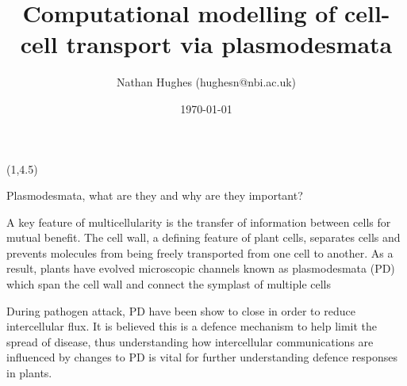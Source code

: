 \documentclass[final]{beamer}
\title{ Computational modelling of cell-cell transport via plasmodesmata }
\author{Nathan Hughes (hughesn@nbi.ac.uk)}
\date{\today}
\begin{document}
\begin{frame}{}

  \begin{textblock}{28}(1,4.5)

    \begin{block}{Plasmodesmata, what are they and why are they important?}

A key feature of multicellularity is the transfer of information
between cells for mutual benefit. The cell wall, a defining feature of
plant cells, separates cells and prevents molecules from being
freely transported from one cell to another. As a result, plants have evolved
microscopic channels known as plasmodesmata (PD) which span the cell
wall and connect the symplast of multiple cells \cite{chevalPlasmodesmalRegulationPlant2018}

\vspace{1cm}

During pathogen attack, PD have been show to close in order
to reduce intercellular flux. It is believed this is a defence
mechanism to help limit the spread of disease, thus understanding how
intercellular communications are influenced by changes to PD is vital
for further understanding defence responses in plants.


\end{block}
\end{textblock}
\end{frame}
\end{document}

